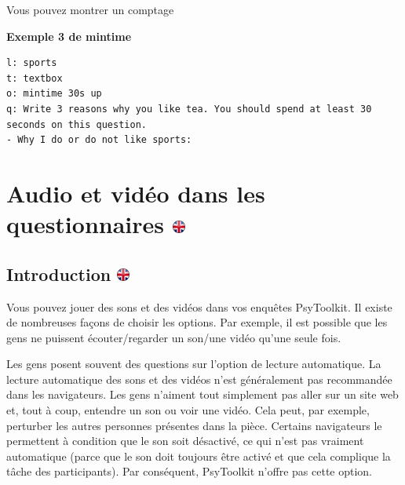 \documentclass[
]{book}
\begin{document}
Vous pouvez montrer un comptage

\textbf{Exemple 3 de mintime}

\begin{verbatim}
l: sports
t: textbox
o: mintime 30s up
q: Write 3 reasons why you like tea. You should spend at least 30 seconds on this question.
- Why I do or do not like sports:
\end{verbatim}

\hypertarget{audio-et-viduxe9o-dans-les-questionnaires}{%
\chapter[Audio et vidéo dans les questionnaires ]{\texorpdfstring{Audio
et vidéo dans les questionnaires
\href{https://www.psytoolkit.org/lessons/surveyaudiovideo.html}{\protect\includegraphics{img/ukflag.png}}}{Audio et vidéo dans les questionnaires }}\label{audio-et-viduxe9o-dans-les-questionnaires}}

\hypertarget{introduction-1}{%
\section[Introduction ]{\texorpdfstring{Introduction
\href{https://www.psytoolkit.org/lessons/surveyaudiovideo.html\#_introduction}{\protect\includegraphics{img/ukflag.png}}}{Introduction }}\label{introduction-1}}

Vous pouvez jouer des sons et des vidéos dans vos enquêtes PsyToolkit.
Il existe de nombreuses façons de choisir les options. Par exemple, il
est possible que les gens ne puissent écouter/regarder un son/une vidéo
qu'une seule fois.

Les gens posent souvent des questions sur l'option de lecture
automatique. La lecture automatique des sons et des vidéos n'est
généralement pas recommandée dans les navigateurs. Les gens n'aiment
tout simplement pas aller sur un site web et, tout à coup, entendre un
son ou voir une vidéo. Cela peut, par exemple, perturber les autres
personnes présentes dans la pièce. Certains navigateurs le permettent à
condition que le son soit désactivé, ce qui n'est pas vraiment
automatique (parce que le son doit toujours être activé et que cela
complique la tâche des participants). Par conséquent, PsyToolkit n'offre
pas cette option.
\end{document}
